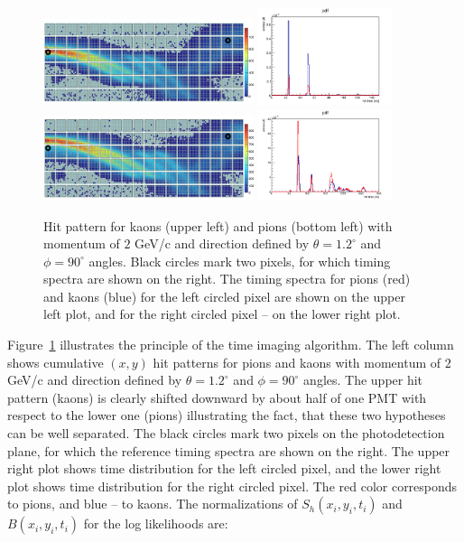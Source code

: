 \begin{figure}[!h]
\centering
\includegraphics[width=0.55\textwidth]{pics/kaonsTI.png} \hspace{0.05\textwidth} \includegraphics[width=0.35\textwidth]{pics/LeftPix.png} \\
\includegraphics[width=0.55\textwidth]{pics/pionsTI.png} \hspace{0.05\textwidth} \includegraphics[width=0.35\textwidth]{pics/rightPix.png} 
\caption{\label{pic:hitpatKpi}
Hit pattern for kaons (upper left) and pions (bottom left) with momentum of $2$ GeV/c and direction defined by $\theta = 1.2^{\circ}$ and $\phi = 90^{\circ}$ angles. Black circles mark two pixels, for which timing spectra are shown on the right. The timing spectra for pions (red) and kaons (blue) for the left circled pixel are shown on the upper left plot, and for the right circled pixel -- on the lower right plot.
}
\end{figure}
 
Figure~\ref{pic:hitpatKpi} illustrates the principle of the time imaging  algorithm. The left column shows cumulative $(x, y)$ hit patterns for pions and kaons with momentum of $2$ GeV/c and direction defined by $\theta = 1.2^{\circ}$ and $\phi = 90^{\circ}$ angles. The upper hit pattern (kaons) is clearly shifted downward by about half of one PMT with respect to the lower one (pions) illustrating the fact, that these two hypotheses can be well separated. The black circles mark two pixels on the photodetection plane, for which the reference timing spectra are shown on the right. The upper right plot shows time distribution for the left circled pixel, and the lower right plot shows time distribution for the right circled pixel. The red color corresponds to pions, and blue -- to kaons. The normalizations of $S_{h} (x_{i}, y_{i}, t_{i})$ and $B(x_{i}, y_{i}, t_{i})$ for the log likelihoods are:

